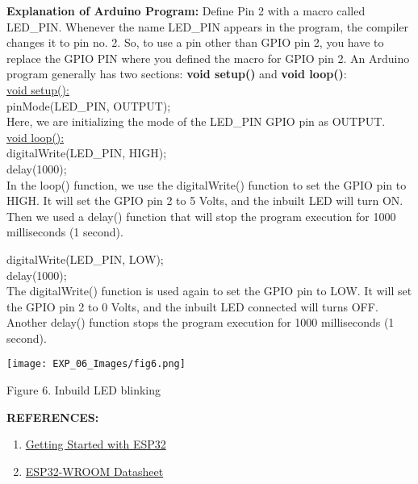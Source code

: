 \documentclass[12pt,a4paper]{article}
\begin{document}
\setlength{\parindent}{0eM}
\begin{justify}\textbf{Explanation of Arduino Program:} Define Pin 2 with a macro called LED\_PIN. Whenever the name LED\_PIN appears in the program, the compiler changes it to pin no. 2. So, to use a pin other than GPIO pin 2, you have to replace the GPIO PIN where you defined the macro for GPIO pin 2.
An Arduino program generally has two sections: \textbf{void setup()} and \textbf{void loop()}:\\[3pt]
\underline{void setup():}\\[6pt]
pinMode(LED\_PIN, OUTPUT);\\[3pt]
Here, we are initializing the mode of the LED\_PIN GPIO pin as OUTPUT.\\[3pt]
\underline{void loop():}\\[6pt]
digitalWrite(LED\_PIN, HIGH);\\[3pt]
delay(1000);\\[6pt]

\noindent In the loop() function, we use the digitalWrite() function to set the GPIO pin to HIGH. It will set the GPIO pin 2 to 5 Volts, and the inbuilt LED will turn ON. Then we used a delay() function that will stop the program execution for 1000 milliseconds (1 second).

\noindent digitalWrite(LED\_PIN, LOW);\\[3pt]
delay(1000);\\[6pt]

\noindent The digitalWrite() function is used again to set the GPIO pin to LOW. It will set the GPIO pin 2 to 0 Volts, and the inbuilt LED connected will turns OFF. Another delay() function stops the program execution for 1000 milliseconds (1 second).\end{justify}

\begin{center} 
\texttt{[image: EXP\_06\_Images/fig6.png]}
\end{center}
\begin{center} {Figure 6. Inbuild  LED blinking}\end{center}


\setlength{\parindent}{0eM}
\textbf{\large REFERENCES:}
\vspace{-6mm}
\begin{enumerate}
\setlength\itemsep{-0.3em}
 \item  \href{https://www.electronicshub.org/getting-started-with-esp32/}{Getting Started with ESP32}
\item   \href{https://www.espressif.com/sites/default/files/documentation/esp32-wroom-32_datasheet_en.pdf}{ESP32-WROOM Datasheet}
\end{enumerate}
\end{document}
